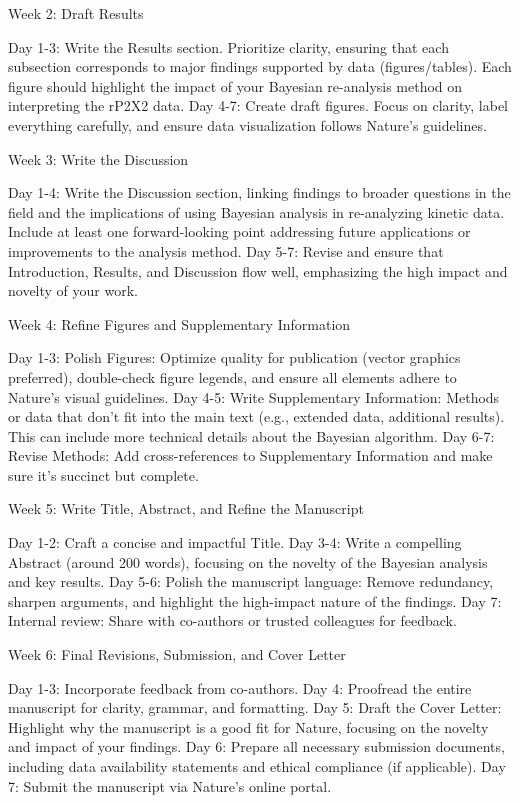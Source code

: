 \documentclass[pdflatex,sn-mathphys-num]{sn-jnl}%
\theoremstyle{thmstyleone}%
\theoremstyle{thmstyletwo}%
\theoremstyle{thmstylethree}%
\begin{document}
Week 2: Draft Results

Day 1-3: Write the Results section. Prioritize clarity, ensuring that each subsection corresponds to major findings supported by data (figures/tables).
Each figure should highlight the impact of your Bayesian re-analysis method on interpreting the rP2X2 data.
Day 4-7: Create draft figures. Focus on clarity, label everything carefully, and ensure data visualization follows Nature’s guidelines.

Week 3: Write the Discussion

Day 1-4: Write the Discussion section, linking findings to broader questions in the field and the implications of using Bayesian analysis in re-analyzing kinetic data.
Include at least one forward-looking point addressing future applications or improvements to the analysis method.
Day 5-7: Revise and ensure that Introduction, Results, and Discussion flow well, emphasizing the high impact and novelty of your work.

Week 4: Refine Figures and Supplementary Information

Day 1-3: Polish Figures: Optimize quality for publication (vector graphics preferred), double-check figure legends, and ensure all elements adhere to Nature's visual guidelines.
Day 4-5: Write Supplementary Information: Methods or data that don't fit into the main text (e.g., extended data, additional results). This can include more technical details about the Bayesian algorithm.
Day 6-7: Revise Methods: Add cross-references to Supplementary Information and make sure it’s succinct but complete.

Week 5: Write Title, Abstract, and Refine the Manuscript

Day 1-2: Craft a concise and impactful Title.
Day 3-4: Write a compelling Abstract (around 200 words), focusing on the novelty of the Bayesian analysis and key results.
Day 5-6: Polish the manuscript language: Remove redundancy, sharpen arguments, and highlight the high-impact nature of the findings.
Day 7: Internal review: Share with co-authors or trusted colleagues for feedback.

Week 6: Final Revisions, Submission, and Cover Letter

Day 1-3: Incorporate feedback from co-authors.
Day 4: Proofread the entire manuscript for clarity, grammar, and formatting.
Day 5: Draft the Cover Letter: Highlight why the manuscript is a good fit for Nature, focusing on the novelty and impact of your findings.
Day 6: Prepare all necessary submission documents, including data availability statements and ethical compliance (if applicable).
Day 7: Submit the manuscript via Nature's online portal.
\end{document}

